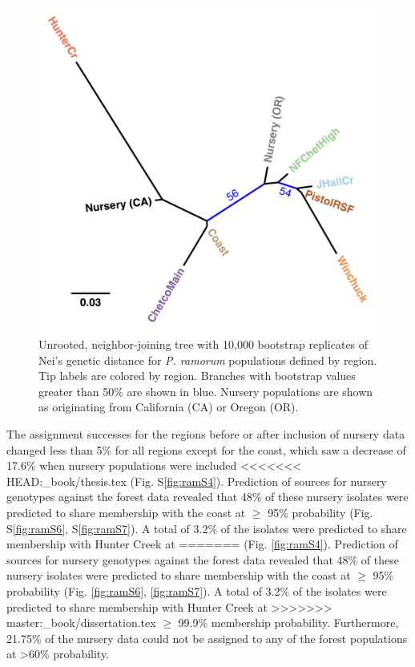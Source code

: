 \documentclass[double,12pt]{beavtex}
\begin{document}
  \begin{figure}
  
  {\centering \includegraphics[width=0.8\linewidth]{figure/phytopathology/figure_5} 
  
  }
  
  \caption[Unrooted, neighbor-joining tree with 10,000 bootstrap replicates of
  Nei's genetic distance for \emph{P. ramorum} populations defined by
  region.]{Unrooted, neighbor-joining tree with 10,000 bootstrap replicates of
  Nei's genetic distance for \emph{P. ramorum} populations defined by
  region. Tip labels are colored by region. Branches with bootstrap values
  greater than 50\% are shown in blue. Nursery populations are shown as
  originating from California (CA) or Oregon (OR).}\label{fig:ramorum5}
  \end{figure}
  
  \newpage
  
  The assignment successes for the regions before or after inclusion of
  nursery data changed less than 5\% for all regions except for the coast,
  which saw a decrease of 17.6\% when nursery populations were included
<<<<<<< HEAD:_book/thesis.tex
  (Fig. S\ref{fig:ramS4}). Prediction of sources for nursery genotypes
  against the forest data revealed that 48\% of these nursery isolates
  were predicted to share membership with the coast at \(\geq\) 95\%
  probability (Fig. S\ref{fig:ramS6}, S\ref{fig:ramS7}). A total of 3.2\%
  of the isolates were predicted to share membership with Hunter Creek at
=======
  (Fig. \ref{fig:ramS4}). Prediction of sources for nursery genotypes
  against the forest data revealed that 48\% of these nursery isolates
  were predicted to share membership with the coast at \(\geq\) 95\%
  probability (Fig. \ref{fig:ramS6}, \ref{fig:ramS7}). A total of 3.2\% of
  the isolates were predicted to share membership with Hunter Creek at
>>>>>>> master:_book/dissertation.tex
  \(\geq\) 99.9\% membership probability. Furthermore, 21.75\% of the
  nursery data could not be assigned to any of the forest populations at
  \textgreater{}60\% probability.
  
\end{document}
